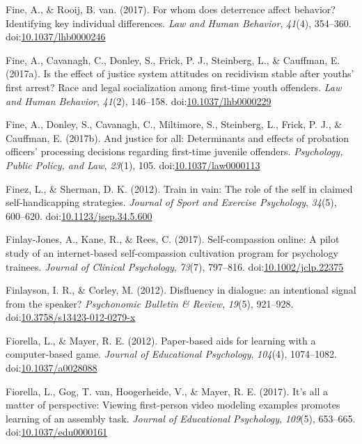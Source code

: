 \documentclass[english,man]{apa6}
\begin{document}
\hypertarget{ref-Fine2017a}{}
Fine, A., \& Rooij, B. van. (2017). For whom does deterrence affect
behavior? Identifying key individual differences. \emph{Law and Human
Behavior}, \emph{41}(4), 354--360.
doi:\href{https://doi.org/10.1037/lhb0000246}{10.1037/lhb0000246}

\hypertarget{ref-Fine2017}{}
Fine, A., Cavanagh, C., Donley, S., Frick, P. J., Steinberg, L., \&
Cauffman, E. (2017a). Is the effect of justice system attitudes on
recidivism stable after youths' first arrest? Race and legal
socialization among first-time youth offenders. \emph{Law and Human
Behavior}, \emph{41}(2), 146--158.
doi:\href{https://doi.org/10.1037/lhb0000229}{10.1037/lhb0000229}

\hypertarget{ref-Fine2017b}{}
Fine, A., Donley, S., Cavanagh, C., Miltimore, S., Steinberg, L., Frick,
P. J., \& Cauffman, E. (2017b). And justice for all: Determinants and
effects of probation officers' processing decisions regarding first-time
juvenile offenders. \emph{Psychology, Public Policy, and Law},
\emph{23}(1), 105.
doi:\href{https://doi.org/10.1037/law0000113}{10.1037/law0000113}

\hypertarget{ref-Finez2012}{}
Finez, L., \& Sherman, D. K. (2012). Train in vain: The role of the self
in claimed self-handicapping strategies. \emph{Journal of Sport and
Exercise Psychology}, \emph{34}(5), 600--620.
doi:\href{https://doi.org/10.1123/jsep.34.5.600}{10.1123/jsep.34.5.600}

\hypertarget{ref-Finlay-Jones2017}{}
Finlay-Jones, A., Kane, R., \& Rees, C. (2017). Self-compassion online:
A pilot study of an internet-based self-compassion cultivation program
for psychology trainees. \emph{Journal of Clinical Psychology},
\emph{73}(7), 797--816.
doi:\href{https://doi.org/10.1002/jclp.22375}{10.1002/jclp.22375}

\hypertarget{ref-Finlayson2012}{}
Finlayson, I. R., \& Corley, M. (2012). Disfluency in dialogue: an
intentional signal from the speaker? \emph{Psychonomic Bulletin \&
Review}, \emph{19}(5), 921--928.
doi:\href{https://doi.org/10.3758/s13423-012-0279-x}{10.3758/s13423-012-0279-x}

\hypertarget{ref-Fiorella2012}{}
Fiorella, L., \& Mayer, R. E. (2012). Paper-based aids for learning with
a computer-based game. \emph{Journal of Educational Psychology},
\emph{104}(4), 1074--1082.
doi:\href{https://doi.org/10.1037/a0028088}{10.1037/a0028088}

\hypertarget{ref-Fiorella2017}{}
Fiorella, L., Gog, T. van, Hoogerheide, V., \& Mayer, R. E. (2017). It's
all a matter of perspective: Viewing first-person video modeling
examples promotes learning of an assembly task. \emph{Journal of
Educational Psychology}, \emph{109}(5), 653--665.
doi:\href{https://doi.org/10.1037/edu0000161}{10.1037/edu0000161}
\end{document}

